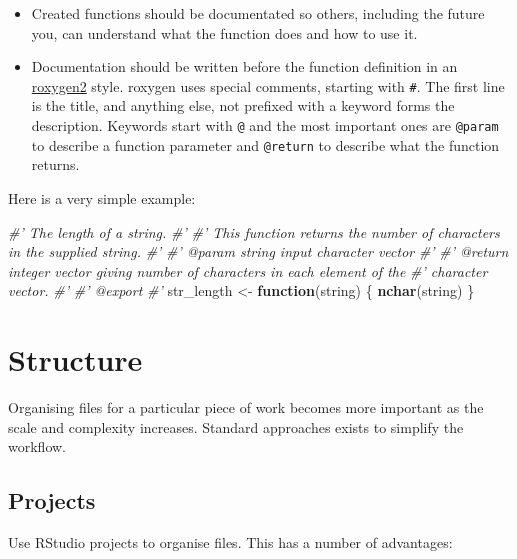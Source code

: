 \documentclass[]{book}
\newenvironment{Shaded}{\begin{snugshade}}{\end{snugshade}}
\newcommand{\KeywordTok}[1]{\textcolor[rgb]{0.13,0.29,0.53}{\textbf{#1}}}
\newcommand{\StringTok}[1]{\textcolor[rgb]{0.31,0.60,0.02}{#1}}
\newcommand{\CommentTok}[1]{\textcolor[rgb]{0.56,0.35,0.01}{\textit{#1}}}
\newcommand{\ControlFlowTok}[1]{\textcolor[rgb]{0.13,0.29,0.53}{\textbf{#1}}}
\newcommand{\NormalTok}[1]{#1}
\providecommand{\tightlist}{%
  \setlength{\itemsep}{0pt}\setlength{\parskip}{0pt}}
\theoremstyle{definition}
\theoremstyle{definition}
\theoremstyle{definition}
\theoremstyle{remark}
\begin{document}
\begin{itemize}
\tightlist
\item
  Created functions should be documentated so others, including the
  future you, can understand what the function does and how to use it.
\item
  Documentation should be written before the function definition in an
  \href{https://cran.r-project.org/web/packages/roxygen2/vignettes/markdown.html}{roxygen2}
  style. roxygen uses special comments, starting with
  \texttt{\#\textquotesingle{}}. The first line is the title, and
  anything else, not prefixed with a keyword forms the description.
  Keywords start with \texttt{@} and the most important ones are
  \texttt{@param} to describe a function parameter and \texttt{@return}
  to describe what the function returns.
\end{itemize}

Here is a very simple example:

\begin{Shaded}
\begin{Highlighting}[]
\CommentTok{#' The length of a string.}
\CommentTok{#'}
\CommentTok{#' This function returns the number of characters in the supplied string.}
\CommentTok{#' }
\CommentTok{#' @param string input character vector}
\CommentTok{#'}
\CommentTok{#' @return integer vector giving number of characters in each element of the}
\CommentTok{#'   character vector.}
\CommentTok{#'}
\CommentTok{#' @export}
\CommentTok{#'}
\NormalTok{str_length <-}\StringTok{ }\ControlFlowTok{function}\NormalTok{(string) \{}
  \KeywordTok{nchar}\NormalTok{(string)}
\NormalTok{\}}
\end{Highlighting}
\end{Shaded}

\section{Structure}\label{structure}

Organising files for a particular piece of work becomes more important
as the scale and complexity increases. Standard approaches exists to
simplify the workflow.

\subsection{Projects}\label{projects}

Use RStudio projects to organise files. This has a number of advantages:
\end{document}
